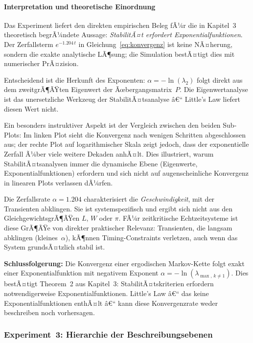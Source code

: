 ﻿\documentclass[a4paper,12pt]{scrreprt}
\theoremstyle{definition}
\begin{document}
\paragraph{Interpretation und theoretische Einordnung}

Das Experiment liefert den direkten empirischen Beleg fÃ¼r die in
Kapitel~3 theoretisch begrÃ¼ndete Aussage: \emph{StabilitÃ¤t erfordert
	Exponentialfunktionen}.  Der Zerfallsterm $e^{-1.204\,t}$ in
Gleichung~\eqref{eq:konvergenz} ist keine NÃ¤herung, sondern die exakte
analytische LÃ¶sung; die Simulation bestÃ¤tigt dies mit numerischer
PrÃ¤zision.

Entscheidend ist die Herkunft des Exponenten: $\alpha = -\ln(\lambda_2)$
folgt direkt aus dem zweitgrÃ¶ÃŸten Eigenwert der Ãœbergangsmatrix~$P$.
Die Eigenwertanalyse ist das unersetzliche Werkzeug der
StabilitÃ¤tsanalyse â€“ Little's Law liefert diesen Wert nicht.

Ein besonders instruktiver Aspekt ist der Vergleich zwischen den
beiden Sub-Plots: Im linken Plot sieht die Konvergenz nach wenigen
Schritten abgeschlossen aus; der rechte Plot auf logarithmischer
Skala zeigt jedoch, dass der exponentielle Zerfall Ã¼ber viele weitere
Dekaden anhÃ¤lt.  Dies illustriert, warum StabilitÃ¤tsanalysen immer
die dynamische Ebene (Eigenwerte, Exponentialfunktionen) erfordern
und sich nicht auf augenscheinliche Konvergenz in linearen Plots
verlassen dÃ¼rfen.

Die Zerfallsrate $\alpha = 1.204$ charakterisiert die
\emph{Geschwindigkeit}, mit der Transienten abklingen.  Sie ist
systemspezifisch und ergibt sich nicht aus den GleichgewichtsgrÃ¶ÃŸen
$L$, $W$ oder $\pi$.  FÃ¼r zeitkritische Echtzeitsysteme ist diese
GrÃ¶ÃŸe von direkter praktischer Relevanz: Transienten, die langsam
abklingen (kleines~$\alpha$), kÃ¶nnen Timing-Constraints verletzen,
auch wenn das System grundsÃ¤tzlich stabil ist.

\textbf{Schlussfolgerung:} Die Konvergenz einer ergodischen
Markov-Kette folgt exakt einer Exponentialfunktion mit negativem
Exponent $\alpha = -\ln(\lambda_{\max,\,k \neq 1})$.  Dies bestÃ¤tigt
Theorem~2 aus Kapitel~3: StabilitÃ¤tskriterien erfordern notwendigerweise
Exponentialfunktionen.  Little's Law â€“ das keine Exponentialfunktionen
enthÃ¤lt â€“ kann diese Konvergenzrate weder beschreiben noch vorhersagen.

\subsubsection{Experiment~3: Hierarchie der Beschreibungsebenen}
\label{subsubsec:exp3}
\end{document}
